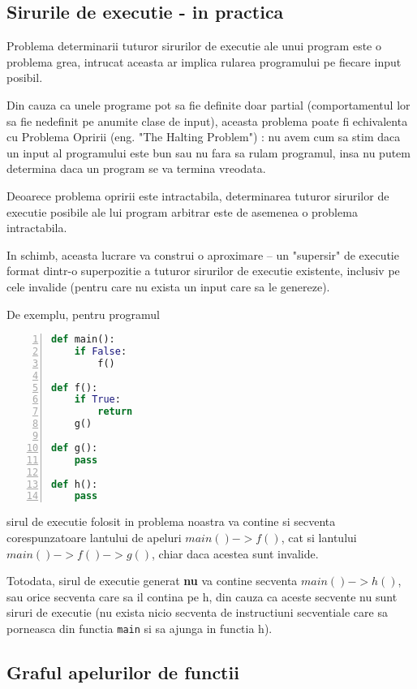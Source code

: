 \subsection{Sirurile de executie - in practica}

Problema determinarii tuturor sirurilor de executie ale unui
program este o problema grea, intrucat aceasta ar implica rularea
programului pe fiecare input posibil.

Din cauza ca unele programe pot sa fie definite doar partial
(comportamentul lor sa fie nedefinit pe anumite clase de input),
aceasta problema poate fi echivalenta cu Problema Opririi (eng. "The
Halting Problem") \cite{the_halting_problem}: nu avem cum sa stim
daca un input al programului este bun sau nu fara sa rulam
programul, insa nu putem determina daca un program se va termina
vreodata.

Deoarece problema opririi este intractabila, determinarea tuturor
sirurilor de executie posibile ale lui program arbitrar este de
asemenea o problema intractabila.

In schimb, aceasta lucrare va construi o aproximare -- un "supersir"
de executie format dintr-o superpozitie a tuturor
sirurilor de executie existente, inclusiv pe cele
invalide (pentru care nu exista un input care sa le genereze).

De exemplu, pentru programul
\begin{lstlisting}[language=Python, numbers=left]
def main():
    if False:
        f()

def f():
    if True:
        return
    g()

def g():
    pass

def h():
    pass
\end{lstlisting}

sirul de executie folosit in problema noastra va contine si
secventa corespunzatoare lantului de apeluri \(main() -> f()\),
cat si lantului \(main() -> f() -> g()\),
chiar daca acestea sunt invalide.

Totodata, sirul de executie generat \textbf{nu} va contine
secventa \(main() -> h()\), sau orice secventa care sa il contina
pe h, din cauza ca aceste secvente nu sunt siruri de executie
(nu exista nicio secventa de instructiuni secventiale
care sa porneasca din functia \texttt{main} si sa ajunga in
functia h).

\subsection{Graful apelurilor de functii}

